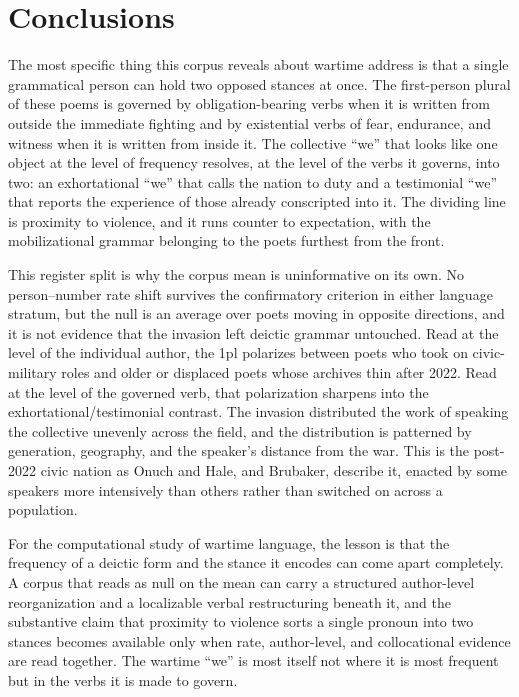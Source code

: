 \documentclass[12pt]{interact}
\theoremstyle{plain}%
\theoremstyle{definition}
\theoremstyle{remark}
\begin{document}
\section{Conclusions}

The most specific thing this corpus reveals about wartime address is that a single grammatical person can hold two opposed stances at once. The first-person plural of these poems is governed by obligation-bearing verbs when it is written from outside the immediate fighting and by existential verbs of fear, endurance, and witness when it is written from inside it. The collective ``we'' that looks like one object at the level of frequency resolves, at the level of the verbs it governs, into two: an exhortational ``we'' that calls the nation to duty and a testimonial ``we'' that reports the experience of those already conscripted into it. The dividing line is proximity to violence, and it runs counter to expectation, with the mobilizational grammar belonging to the poets furthest from the front.

This register split is why the corpus mean is uninformative on its own. No person--number rate shift survives the confirmatory criterion in either language stratum, but the null is an average over poets moving in opposite directions, and it is not evidence that the invasion left deictic grammar untouched. Read at the level of the individual author, the 1pl polarizes between poets who took on civic-military roles and older or displaced poets whose archives thin after 2022. Read at the level of the governed verb, that polarization sharpens into the exhortational/testimonial contrast. The invasion distributed the work of speaking the collective unevenly across the field, and the distribution is patterned by generation, geography, and the speaker's distance from the war. This is the post-2022 civic nation as Onuch and Hale, and Brubaker, describe it, enacted by some speakers more intensively than others rather than switched on across a population.

For the computational study of wartime language, the lesson is that the frequency of a deictic form and the stance it encodes can come apart completely. A corpus that reads as null on the mean can carry a structured author-level reorganization and a localizable verbal restructuring beneath it, and the substantive claim that proximity to violence sorts a single pronoun into two stances becomes available only when rate, author-level, and collocational evidence are read together. The wartime ``we'' is most itself not where it is most frequent but in the verbs it is made to govern.
\end{document}

